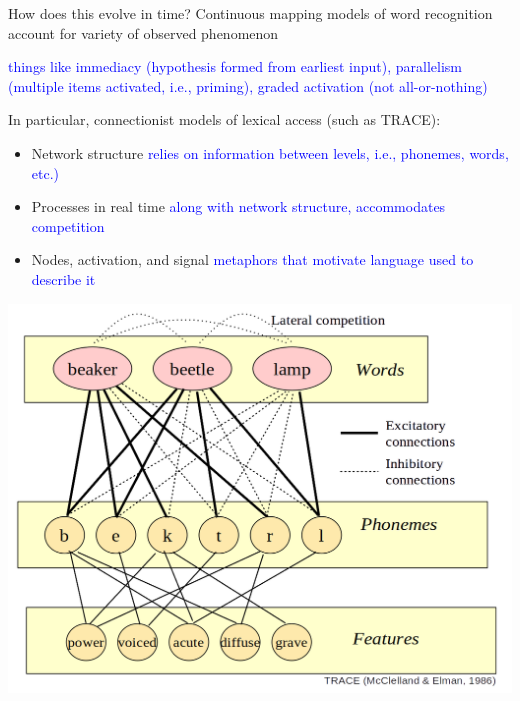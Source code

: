 \documentclass{beamer}
\newcommand{\vp}{\vspace{2mm}}
\providecommand{\cn}[1]{\textcolor{blue}{#1}}
\begin{document}
\begin{frame}{How does this evolve in time?} \large
Continuous mapping models of word recognition account for variety of observed phenomenon  \vp

\cn{things like immediacy (hypothesis formed from earliest input), parallelism (multiple items activated, i.e., priming), graded activation (not all-or-nothing)} \vp

In particular, connectionist models of lexical access (such as TRACE):
\begin{itemize}
\item Network structure \cn{relies on information between levels, i.e., phonemes, words, etc.)}
\item Processes in real time \cn{along with network structure, accommodates competition}
\item Nodes, activation, and signal \cn{metaphors that motivate language used to describe it}
\end{itemize}
\end{frame}



\begin{frame}
\begin{center}
\includegraphics[scale=0.4]{img/trace_competition.png}
\end{center}
\end{frame}
\end{document}
